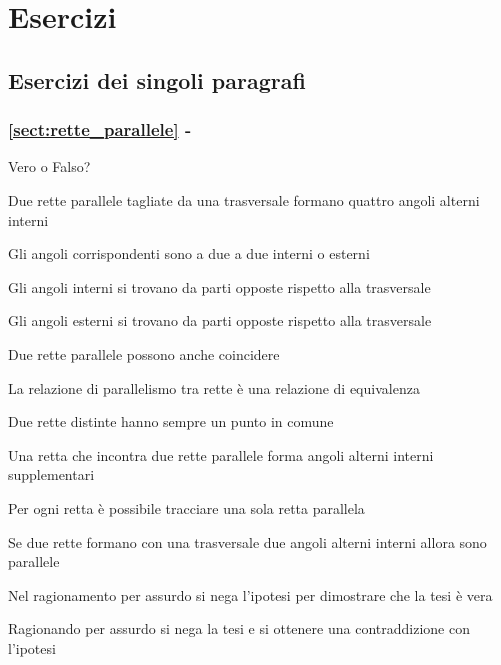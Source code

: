 
\section{Esercizi}

\subsection{Esercizi dei singoli paragrafi}

\begingroup
\hypersetup{linkcolor=black}
\subsubsection*{\ref{sect:rette_parallele} - 
}
\endgroup

\begin{esercizio}
\label{ese:3.15}
Vero o Falso?
\begin{enumeratea}
\item Due rette parallele tagliate da una trasversale formano quattro 
angoli alterni interni\tab\hfill\boxV\quad\boxF
\item Gli angoli corrispondenti sono a due a due interni o 
esterni\hfill\boxV\quad\boxF
\item Gli angoli interni si trovano da parti opposte rispetto alla 
trasversale\hfill\boxV\quad\boxF
\item Gli angoli esterni si trovano da parti opposte rispetto alla 
trasversale\hfill\boxV\quad\boxF
\item Due rette parallele possono anche 
coincidere\hfill\boxV\quad\boxF
\item La relazione di parallelismo tra rette è una relazione di 
equivalenza\hfill\boxV\quad\boxF
\item Due rette distinte hanno sempre un punto in 
comune\hfill\boxV\quad\boxF
\item Una retta che incontra due rette parallele forma angoli alterni 
interni supplementari\tab\hfill\boxV\quad\boxF
\item Per ogni retta è possibile tracciare una sola retta 
parallela\hfill\boxV\quad\boxF
\item Se due rette formano con una trasversale due angoli alterni 
interni allora sono parallele\tab\hfill\boxV\quad\boxF
\item Nel ragionamento per assurdo si nega l'ipotesi per dimostrare 
che la tesi è vera\tab\tab\hfill\boxV\quad\boxF
\item Ragionando per assurdo si nega la tesi e si ottenere una 
contraddizione con l'ipotesi\tab\hfill\boxV\quad\boxF
\end{enumeratea}
\end{esercizio}

